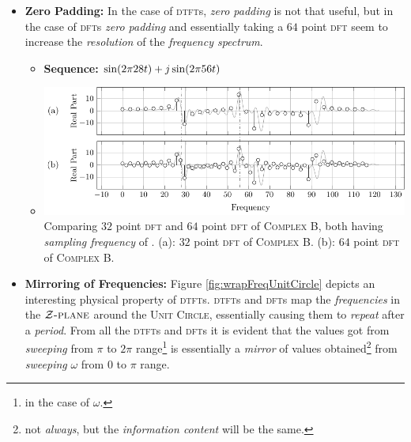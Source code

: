 \documentclass[../../course]{subfiles}
\begin{document}
\begin{itemize} [label=]

    \item \textbf{Zero Padding:} In the case of \textsc{dtft}s, \emph{zero padding} is not that
        useful, but in the case of \textsc{dft}s \emph{zero padding} and essentially taking a
        $64$ point \textsc{dft} seem to increase the \emph{resolution} of the
        \emph{frequency spectrum}.

        \begin{itemize} [label=]

            \item \textbf{Sequence:} $\sin(2 \pi 28 t) + j \sin(2 \pi 56 t)$

            \item \begin{minipage}[b] {0.85\textwidth}
                    \vspace{6pt}
                    \centering
                     {
                        \includegraphics[height = 0.8\textheight] {tikzpics/plotCompDft32Dft64.pdf}
                    }
                     {
                        Comparing $32$ point \textsc{dft} and $64$ point \textsc{dft} of \textsc{Complex B},
                        both having \emph{sampling frequency} of \sampFreqNormJust.
                        (a): $32$ point \textsc{dft} of \textsc{Complex B}.
                        (b): $64$ point \textsc{dft} of \textsc{Complex B}.
                    }
                    \label{fig:compDft32Dft64}
            \end{minipage}

        \end{itemize}

    \item \textbf{Mirroring of Frequencies:} Figure \ref{fig:wrapFreqUnitCircle} depicts an
        interesting physical property of \textsc{dtft}s. \textsc{dtft}s and \textsc{dft}s
        map the \emph{frequencies} in the $\mathcal{Z}\textsc{-plane}$
        around the \textsc{Unit Circle}, essentially causing them to \emph{repeat} after
        a \emph{period}. From all the \textsc{dtft}s and \textsc{dft}s it is evident that
        the values got from \emph{sweeping} from $\pi$ to $2 \pi$ range\footnote{in the case
        of $\omega$.} is essentially a \emph{mirror} of values obtained\footnote{not
        \emph{always}, but the \emph{information content} will be the same.}
        from \emph{sweeping} $\omega$ from $0$ to $\pi$ range.



\end{itemize}
\end{document}
